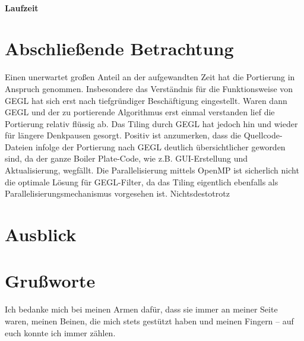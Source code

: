 \documentclass[10pt,a4paper]{article}
\begin{document}
\paragraph{Laufzeit}
\section{Abschließende Betrachtung}
Einen unerwartet großen Anteil an der aufgewandten Zeit hat die Portierung in Anspruch genommen. Insbesondere das Verständnis für die Funktionsweise von GEGL hat sich erst nach tiefgründiger Beschäftigung eingestellt. Waren dann GEGL und der zu portierende Algorithmus erst einmal verstanden lief die Portierung relativ flüssig ab. Das Tiling durch GEGL hat jedoch hin und wieder für längere Denkpausen gesorgt.
Positiv ist anzumerken, dass die Quellcode-Dateien infolge der Portierung nach GEGL deutlich übersichtlicher geworden sind, da der ganze Boiler Plate-Code, wie z.B. GUI-Erstellung und Aktualisierung, wegfällt.
Die Parallelisierung mittels OpenMP ist sicherlich nicht die optimale Lösung für GEGL-Filter, da das Tiling eigentlich ebenfalls als Parallelisierungsmechanismus vorgesehen ist. Nichtsdestotrotz 

\section{Ausblick}
\section{Grußworte}
Ich bedanke mich bei meinen Armen dafür, dass sie immer an meiner Seite waren, meinen Beinen, die mich stets gestützt haben und meinen Fingern -- auf euch konnte ich immer zählen.
%
\end{document}
